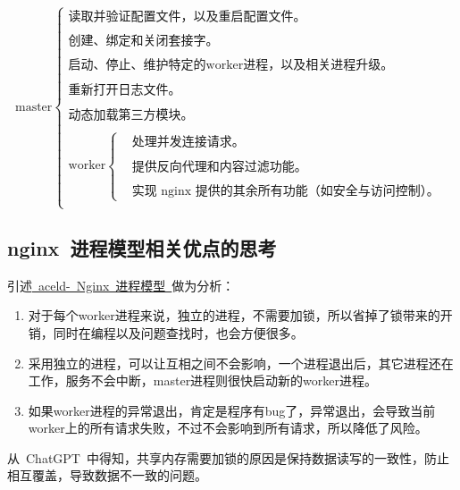 \documentclass[12pt, a4paper]{article} %
\begin{document}
\begin{CJK*}{UTF8}{gbsn}
\[
    \text{master}
    \begin{cases}
         \text{读取并验证配置文件，以及重启配置文件。}   \\\\
         \text{创建、绑定和关闭套接字。} \\\\
         \text{启动、停止、维护特定的worker进程，以及相关进程升级。} \\\\
         \text{重新打开日志文件。} \\\\
         \text{动态加载第三方模块。} \\\\
         \text{worker}\left\{
            \begin{aligned}
                &\text{处理并发连接请求。}  \\\\
                &\text{提供反向代理和内容过滤功能。} \\\\
                &\text{实现~nginx~提供的其余所有功能（如安全与访问控制）。}
            \end{aligned}
            \right. \\
    \end{cases}
\]

\subsection{nginx~进程模型相关优点的思考}

引述\href{https://aceld.gitbooks.io/nginx-zh/content/31_nginxjin_cheng_mo_xing.html}{~aceld-~Nginx~进程模型~}做为分析：

\begin{enumerate}
    \item 对于每个worker进程来说，独立的进程，不需要加锁，所以省掉了锁带来的开销，同时在编程以及问题查找时，也会方便很多。
    \item 采用独立的进程，可以让互相之间不会影响，一个进程退出后，其它进程还在工作，服务不会中断，master进程则很快启动新的worker进程。
    \item 如果worker进程的异常退出，肯定是程序有bug了，异常退出，会导致当前worker上的所有请求失败，不过不会影响到所有请求，所以降低了风险。
\end{enumerate}

从~ChatGPT~中得知，共享内存需要加锁的原因是保持数据读写的一致性，防止相互覆盖，导致数据不一致的问题。



\end{CJK*}
\end{document}
